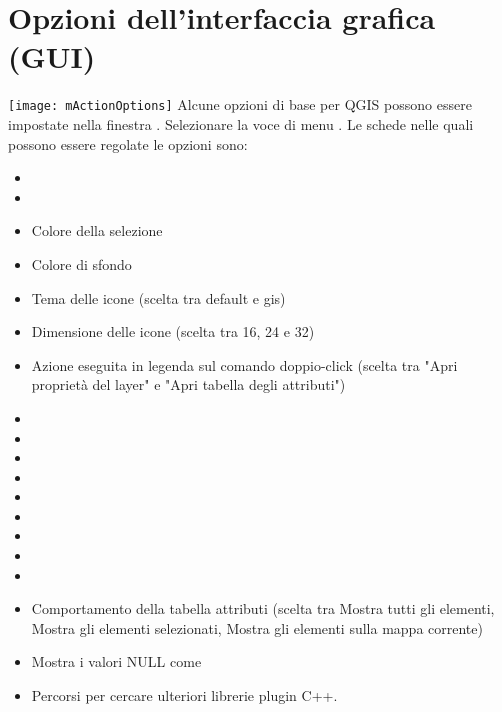 \section{Opzioni dell'interfaccia grafica (GUI)}\label{subsec:gui_options}
\texttt{[image: mActionOptions]} Alcune opzioni di base per QGIS 
possono essere impostate nella finestra . Selezionare la 
voce di menu  \arrow {}. Le schede nelle quali possono essere regolate le opzioni sono:


\begin{itemize}
\item {}
\item {}
\item Colore della selezione
\item Colore di sfondo
\item Tema delle icone (scelta tra default e gis)
\item Dimensione delle icone (scelta tra 16, 24 e 32)
\item Azione eseguita in legenda sul comando doppio-click (scelta tra "Apri proprietà del layer" e "Apri tabella degli attributi")
\item {}
\item {}
\item {}
\item {}
\item {}
\item {}
\item {}
\item {}
\item {}
\item Comportamento della tabella attributi (scelta tra Mostra tutti gli elementi, Mostra gli elementi selezionati, Mostra gli elementi sulla mappa corrente)
\item Mostra i valori NULL come 
\item Percorsi per cercare ulteriori librerie plugin C++. 
\end{itemize}

